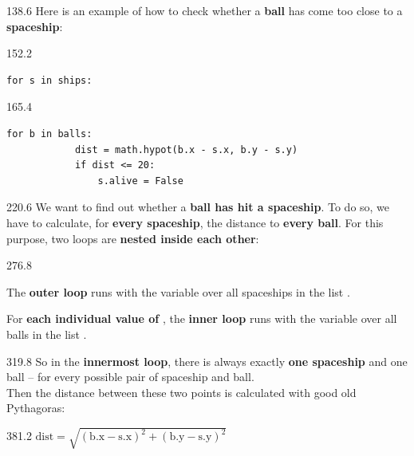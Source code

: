 \documentclass{aslab}
\begin{document}
\begin{region}{138.6}
Here is an example of how to check whether a \textbf{ball} has come too close
to a \textbf{spaceship}:
\end{region}

\begin{region}{152.2}
\begin{lstlisting}[style=py]
    for s in ships:
\end{lstlisting}
\end{region}

\begin{region}{165.4}
\begin{lstlisting}[style=py]
        for b in balls:
            dist = math.hypot(b.x - s.x, b.y - s.y)
            if dist <= 20:
                s.alive = False
\end{lstlisting}
\end{region}

\begin{region}[pitch=14.3]{220.6}
We want to find out whether a \textbf{ball has hit a spaceship}. To do so, we
have to calculate, for \textbf{every spaceship}, the distance to \textbf{every
ball}. For this purpose, two loops are \textbf{nested inside each other}:
\end{region}

\begin{region}[pitch=14.4]{276.8}
\begin{dashlist}
\item The \textbf{outer loop} runs with the variable  over all
  spaceships in the list .
\item For \textbf{each individual value of} , the \textbf{inner loop}
  runs with the variable  over all balls in the list .
\end{dashlist}
\end{region}

\begin{region}[pitch=13.23]{319.8}
So in the \textbf{innermost loop}, there is always exactly \textbf{one
spaceship}  and one ball  -- for every possible pair of
spaceship and ball.\\
Then the distance between these two points is calculated with good old
Pythagoras:
\end{region}

\begin{region}{381.2}
\centering $\text{dist} = \sqrt{(\text{b.x} - \text{s.x})^2
  + (\text{b.y} - \text{s.y})^2}$
\end{region}
\end{document}
